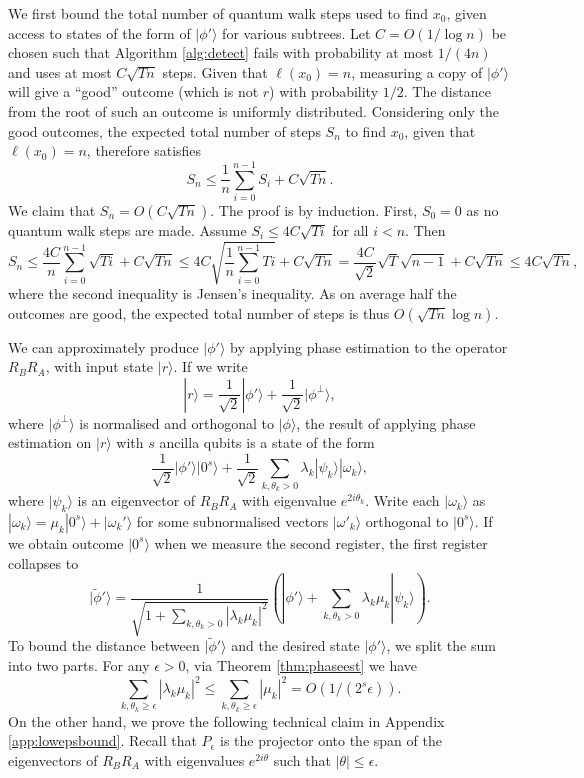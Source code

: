 \documentclass[11pt]{article}
\newcommand{\ket}[1]{| #1 \rangle}
\begin{document}
We first bound the total number of quantum walk steps used to find $x_0$, given access to states of the form of $\ket{\phi'}$ for various subtrees. Let $C = O(1/\log n)$ be chosen such that Algorithm \ref{alg:detect} fails with probability at most $1/(4n)$ and uses at most $C \sqrt{Tn}$ steps. Given that $\ell(x_0) = n$, measuring a copy of $\ket{\phi'}$ will give a ``good'' outcome (which is not $r$) with probability $1/2$. The distance from the root of such an outcome is uniformly distributed. Considering only the good outcomes, the expected total number of steps $S_n$ to find $x_0$, given that $\ell(x_0) = n$, therefore satisfies
%
\[ S_n \le \frac{1}{n} \sum_{i=0}^{n-1} S_i + C \sqrt{Tn}. \]
%
We claim that $S_n = O(C\sqrt{Tn})$. The proof is by induction. First, $S_0 = 0$ as no quantum walk steps are made. Assume $S_i \le 4C \sqrt{Ti}$ for all $i < n$. Then
%
\[ S_n \le \frac{4C}{n} \sum_{i=0}^{n-1} \sqrt{Ti} + C \sqrt{Tn} \le 4C \sqrt{\frac{1}{n} \sum_{i=0}^{n-1} Ti } + C \sqrt{Tn} =\frac{4C}{\sqrt{2}}\sqrt{T}\sqrt{n-1} + C \sqrt{Tn} \le 4C\sqrt{Tn}, \]
%
where the second inequality is Jensen's inequality. As on average half the outcomes are good, the expected total number of steps is thus $O(\sqrt{Tn} \log n)$.

We can approximately produce $\ket{\phi'}$ by applying phase estimation to the operator $R_B R_A$, with input state $\ket{r}$. If we write
%
\[ \ket{r} = \frac{1}{\sqrt{2}} \ket{\phi'} + \frac{1}{\sqrt{2}} \ket{\phi^\perp}, \]
%
where $\ket{\phi^\perp}$ is normalised and orthogonal to $\ket{\phi}$, the result of applying phase estimation on $\ket{r}$ with $s$ ancilla qubits is a state of the form
%
\[  \frac{1}{\sqrt{2}} \ket{\phi'} \ket{0^s} + \frac{1}{\sqrt{2}} \sum_{k, \theta_k > 0} \lambda_k \ket{\psi_k} \ket{\omega_k}, \]
%
where $\ket{\psi_k}$ is an eigenvector of $R_B R_A$ with eigenvalue $e^{2i\theta_k}$. Write each $\ket{\omega_k}$ as $\ket{\omega_k} = \mu_k \ket{0^s} + \ket{\omega_k'}$ for some subnormalised vectors $\ket{\omega'_k}$ orthogonal to $\ket{0^s}$. If we obtain outcome $\ket{0^s}$ when we measure the second register, the first register collapses to
%
\[ \ket{\widetilde{\phi}'} = \frac{1}{\sqrt{1+\sum_{k,\theta_k > 0} |\lambda_k \mu_k|^2}} \left( \ket{\phi'} + \sum_{k,\theta_k>0} \lambda_k \mu_k \ket{\psi_k} \right). \]
%
To bound the distance between $\ket{\widetilde{\phi}'}$ and the desired state $\ket{\phi'}$, we split the sum into two parts. For any $\epsilon > 0$, via Theorem \ref{thm:phaseest} we have
%
\[ \sum_{k,\theta_k \ge \epsilon} |\lambda_k \mu_k|^2 \le \sum_{k,\theta_k \ge \epsilon} |\mu_k|^2 = O(1 / (2^s \epsilon)). \] 
%
On the other hand, we prove the following technical claim in Appendix \ref{app:lowepsbound}. Recall that $P_\epsilon$ is the projector onto the span of the eigenvectors of $R_B R_A$ with eigenvalues $e^{2i \theta}$ such that $|\theta| \le \epsilon$.
\end{document}
